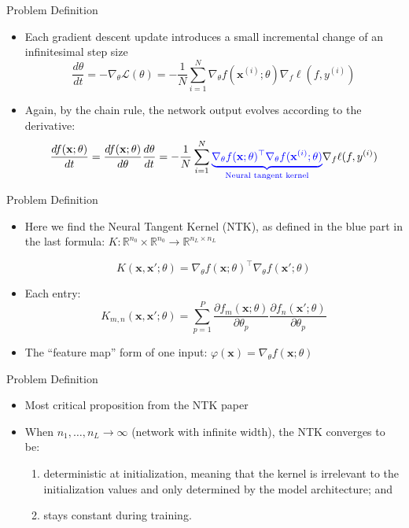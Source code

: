\documentclass[serif, aspectratio=169]{beamer}
\begin{document}
\begin{frame}{Problem Definition}
	
	\begin{itemize}
		\item Each gradient descent update introduces a small incremental change of an infinitesimal step size
		\[
		\frac{d\theta}{d t} = - \nabla_\theta\mathcal{L}(\theta)  = -\frac{1}{N} \sum_{i=1}^N \nabla_\theta f(\mathbf{x}^{(i)}; \theta) \nabla_f \ell(f, y^{(i)})
		\] 
		\item Again, by the chain rule, the network output evolves according to the derivative:
		\[
		\frac{df(\mathbf{x};\theta)}{dt} 
		= \frac{df(\mathbf{x};\theta)}{d\theta}\frac{d\theta}{dt}
		= -\frac{1}{N} \sum_{i=1}^N \color{blue}{\underbrace{\nabla_\theta f(\mathbf{x};\theta)^\top \nabla_\theta f(\mathbf{x}^{(i)}; \theta)}_\text{Neural tangent kernel}} \color{black}{\nabla_f \ell(f, y^{(i)})}
		\]
		
	\end{itemize}
\end{frame}



\begin{frame}{Problem Definition}
	
	\begin{itemize}
		\item Here we find the Neural Tangent Kernel (NTK), as defined in the blue part in the last formula: \(K: \mathbb{R}^{n_0}\times\mathbb{R}^{n_0} \to \mathbb{R}^{n_L \times n_L}\)
		
		\[
		K(\mathbf{x}, \mathbf{x}'; \theta) = \nabla_\theta f(\mathbf{x};\theta)^\top \nabla_\theta f(\mathbf{x}'; \theta)
		\]
		\item Each entry:
		\[
		K_{m,n}(\mathbf{x}, \mathbf{x}'; \theta) = \sum_{p=1}^P \frac{\partial f_m(\mathbf{x};\theta)}{\partial \theta_p} \frac{\partial f_n(\mathbf{x}';\theta)}{\partial \theta_p}
		\]
		\item The “feature map” form of one input: \(\varphi(\mathbf{x}) = \nabla_\theta f(\mathbf{x};\theta)\)
	\end{itemize}
\end{frame}



\begin{frame}{Problem Definition}
	
	\begin{itemize}
		\item Most critical proposition from the NTK paper
		\item When \(n_1, \dots, n_L \to \infty\) (network with infinite width), the NTK converges to be:
		\begin{enumerate}
				\item deterministic at initialization, meaning that the kernel is irrelevant to the initialization values and only determined by the model architecture; and
			\item stays constant during training.
		\end{enumerate}
	
		
	\end{itemize}
\end{frame}
\end{document}
